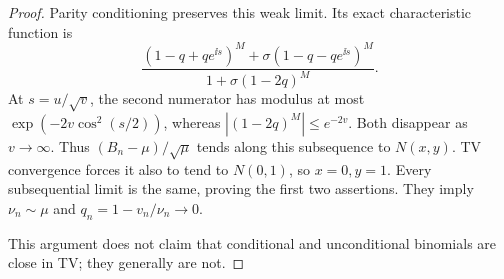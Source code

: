 \begin{proof}
Parity conditioning preserves this weak limit. Its exact characteristic function is
\begin{equation}\label{spb:ml:eq:conditionalCF}
 \frac{(1-q+qe^{\ii s})^M+\sigma(1-q-qe^{\ii s})^M}
                  {1+\sigma(1-2q)^M}.
\end{equation}
At $s=u/\sqrt v$, the second numerator has modulus at most
$\exp(-2v\cos^2(s/2))$, whereas $|(1-2q)^M|\le e^{-2v}$. Both disappear as $v\to\infty$. Thus $(B_n-\mu)/\sqrt\mu$ tends along this subsequence to $N(x,y)$. TV convergence forces it also to tend to $N(0,1)$, so $x=0,y=1$. Every subsequential limit is the same, proving the first two assertions. They imply $\nu_n\sim\mu$ and $q_n=1-v_n/\nu_n\to0$.

This argument does not claim that conditional and unconditional binomials are close in TV; they generally are not.
\end{proof}

